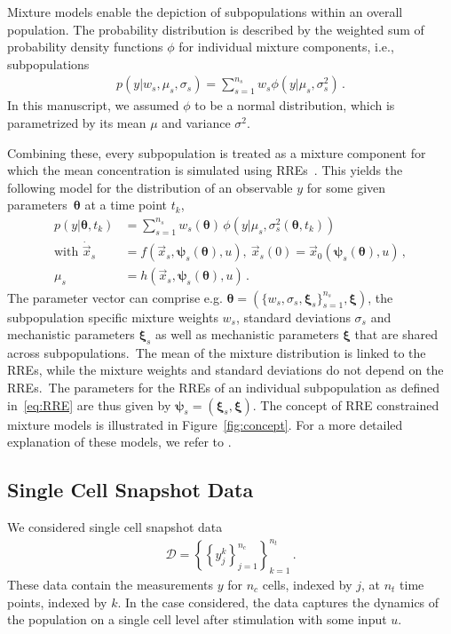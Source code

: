 \documentclass{llncs}
\newcommand{\x}{\vec{x}}
\newcommand{\vtheta}{\boldsymbol{\theta}}
\newcommand{\vpsi}{\boldsymbol{\psi}}
\newcommand{\vxi}{\boldsymbol{\xi}}
\begin{document}
Mixture models enable the depiction of subpopulations within an overall population. The probability distribution is described by the weighted sum of probability density functions $\phi$ for individual mixture components, i.e., subpopulations
\begin{align*}
p(y|w_s,\mu_s,\sigma_s) = \sum_{s=1}^{n_s}w_s \phi(y|\mu_s,\sigma_s^2)\,. 
\end{align*}
In this manuscript, we assumed $\phi$ to be a normal distribution, which is parametrized by its mean $\mu$ and variance $\sigma^2$.

Combining these, every subpopulation is treated as a mixture component for which the mean concentration is simulated using RREs~\cite{Hasenauer2014}. This yields the following model for the distribution of an observable $y$ for some given parameters~$\vtheta$ at a time point $t_k$,
\begin{align*}
p(y|\vtheta,t_k) &=\sum_{s=1}^{n_s} w_s(\vtheta)\,\phi\left(y|\mu_s, \sigma_s^2(\vtheta,t_k)\right) \\
\mbox{with } \dot{\x}_s &= f\left(\x_s, \boldsymbol{\psi}_s(\vtheta), u\right),~\x_s(0) = \x_0(\boldsymbol{\psi}_s(\vtheta), u)\,, \\ 
\mu_s &= h\left(\x_s, \boldsymbol{\psi}_s(\vtheta), u\right)\,.
\end{align*}
The parameter vector can comprise e.g. $\vtheta = \left(\{w_s, \sigma_s, \vxi_s\}_{s=1}^{n_s}, \vxi\right)$, the subpopulation specific mixture weights $w_s$, standard deviations $\sigma_s$ and mechanistic parameters $\vxi_s$ as well as mechanistic parameters $\vxi$ that are shared across subpopulations.\color{revcol}~The mean of the mixture distribution is linked to the RREs, while the mixture weights and standard deviations do not depend on the RREs.\color{black}~The parameters for the RREs of an individual subpopulation as defined in~\eqref{eq:RRE} are thus given by $\vpsi_s = (\vxi_s,\vxi)$. The concept of RRE constrained mixture models is illustrated in Figure~\ref{fig:concept}. For a more detailed explanation of these models, we refer to \cite{Hasenauer2014}. 

\subsection{Single Cell Snapshot Data}
We considered single cell snapshot data
\begin{align*}
\mathcal{D}= \left\{\left\{{y}_{j}^k\right\}_{j=1}^{n_c}\right\}_{k=1}^{n_t}\,. 
\end{align*} 
These data contain the measurements ${y}$ for $n_c$ cells, indexed by $j$, at $n_t$ time points, indexed by $k$. In the case considered, the data captures the dynamics of the population on a single cell level after stimulation with some input $u$.
\end{document}
